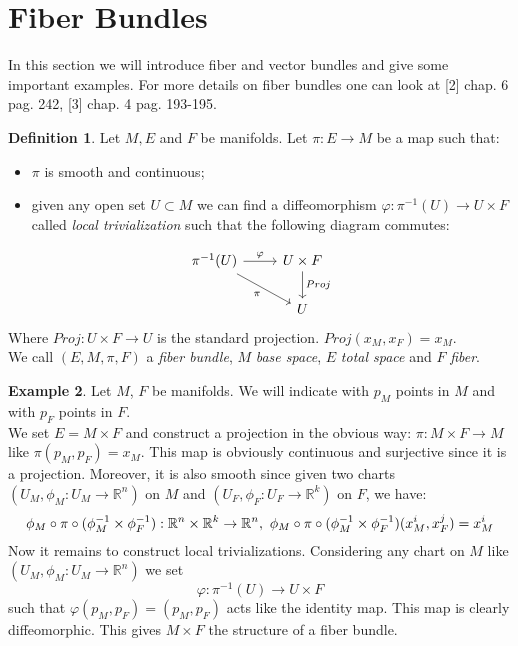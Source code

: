 \documentclass[12pt,a4paper]{report}
\theoremstyle{definition}
\newtheorem{Def}{Definition}[chapter]
\theoremstyle{Theorem}
\theoremstyle{definition}
\newtheorem{Ex}[Def]{Example}
\theoremstyle{definition}
\begin{document}
	\section{Fiber Bundles}
	In this section we will introduce fiber and vector bundles and give some important examples. For more details on fiber bundles one can look at [2] chap. 6 pag. 242, [3] chap. 4 pag. 193-195.
	\begin{Def}
		Let $M, E$ and $F$ be manifolds. Let $\pi: E\rightarrow M$ be a map such that:
		\begin{itemize}
			\item $\pi$ is smooth and continuous;
			\item given any open set $U\subset M$ we can find a diffeomorphism $\varphi: \pi^{-1}(U)\rightarrow U\times F$ called \textit{local trivialization} such that the following diagram commutes:
		\end{itemize}
		\[
		\begin{tikzcd}
			\pi^{-1}(U) \arrow{r}{\varphi} \arrow[swap]{dr}{\pi} & U\times F \arrow{d}{Proj}\\
			& U 
		\end{tikzcd}
		\]
		Where $Proj: U\times F\rightarrow U$ is the standard projection. $Proj(x_M,x_F)=x_M$.\\
		We call $(E,M,\pi,F)$ a \textit{fiber bundle}, $M$ \textit{base space}, $E$ \textit{total space} and $F$ \textit{fiber}.
	\end{Def}
	\begin{Ex}\label{Ex_1.1}
		Let $M$, $F$ be manifolds. We will indicate with $p_M$ points in $M$ and with $p_F$ points in $F$.\\ 
		We set $E=M\times F$ and construct a projection in the obvious way: 
		$\pi:M\times F\rightarrow M$ like $\pi(p_M,p_F)=x_M$. This map is obviously continuous and surjective since it is a projection. Moreover, it is also smooth since given two charts $(U_M,\phi_M:U_M\rightarrow \mathbb{R}^n)$ on $M$ and $(U_F,\phi_F:U_F\rightarrow \mathbb{R}^k)$ on $F$, we have:
		$$\phi_M\circ \pi\circ (\phi_M^{-1}\times \phi_F^{-1}):\mathbb{R}^n\times\mathbb{R}^k\rightarrow\mathbb{R}^n,\hbox{ }\phi_M\circ \pi\circ (\phi_M^{-1}\times \phi_F^{-1})(x^i_M,x^j_F)=x^i_M$$
		Now it remains to construct local trivializations. Considering any chart on $M$ like $(U_M,\phi_M:U_M\rightarrow \mathbb{R}^n)$ we set
		$$\varphi:\pi^{-1}(U)\rightarrow U\times F$$
		such that $\varphi(p_M,p_F)=(p_M,p_F)$ acts like the identity map. This map is clearly diffeomorphic.
		This gives $M\times F$ the structure of a fiber bundle.
	\end{Ex}
\end{document}
